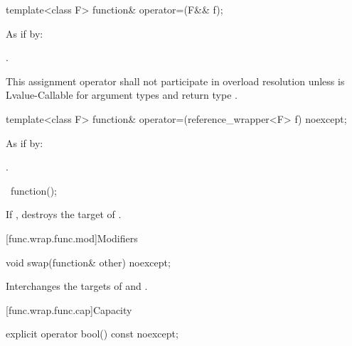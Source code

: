 %
\begin{itemdecl}
template<class F> function& operator=(F&& f);
\end{itemdecl}

\begin{itemdescr}
\pnum
\effects
As if by: 

\pnum
\returns
{}.

\pnum
\remarks
This assignment operator shall not participate in overload
resolution unless  is
Lvalue-Callable for argument types  and
return type .
\end{itemdescr}

%
\begin{itemdecl}
template<class F> function& operator=(reference_wrapper<F> f) noexcept;
\end{itemdecl}

\begin{itemdescr}
\pnum
\effects
As if by: 

\pnum
\returns
{}.
\end{itemdescr}

%
\begin{itemdecl}
~function();
\end{itemdecl}

\begin{itemdescr}
\pnum
\effects
If , destroys the target of .
\end{itemdescr}

[func.wrap.func.mod]{Modifiers}

%
\begin{itemdecl}
void swap(function& other) noexcept;
\end{itemdecl}

\begin{itemdescr}
\pnum
\effects
Interchanges the targets of  and .
\end{itemdescr}

[func.wrap.func.cap]{Capacity}

%
\begin{itemdecl}
explicit operator bool() const noexcept;
\end{itemdecl}

